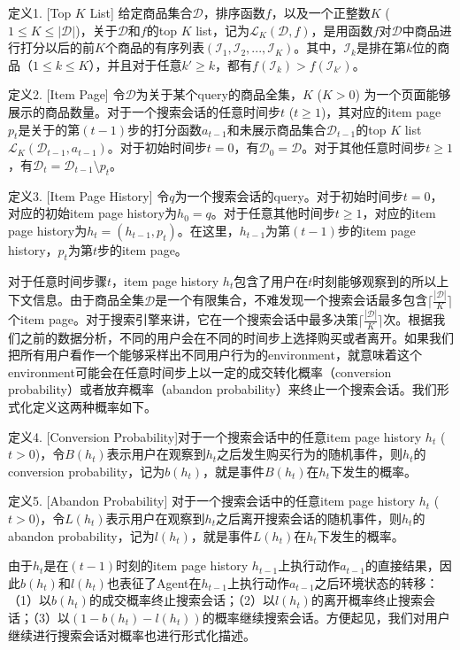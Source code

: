 定义1. [Top $K$ List]
给定商品集合$\mathcal{D}$，排序函数$f$，以及一个正整数$K$ ($1 \leq K \leq |\mathcal{D}|$)，关于$\mathcal{D}$和$f$的top $K$ list，记为$\mathcal{L}_K(\mathcal{D}, f)$，是用函数$f$对$\mathcal{D}$中商品进行打分以后的前$K$个商品的有序列表$(\mathcal{I}_1, \mathcal{I}_2, ..., \mathcal{I}_K)$。其中，$\mathcal{I}_k$是排在第$k$位的商品（$1 \leq k \leq K$），并且对于任意$k' \geq k$，都有$f(\mathcal{I}_k) > f(\mathcal{I}_{k'})$。

定义2. [Item Page]
令$\mathcal{D}$为关于某个query的商品全集，$K$ ($K > 0$) 为一个页面能够展示的商品数量。对于一个搜索会话的任意时间步$t$ ($t \geq 1$)，其对应的item page $p_{t}$是关于的第$(t-1)$步的打分函数$a_{t-1}$和未展示商品集合$\mathcal{D}_{t-1}$的top $K$ list $\mathcal{L}_K(\mathcal{D}_{t-1}, a_{t-1})$。对于初始时间步$t = 0$，有$\mathcal{D}_0 = \mathcal{D}$。对于其他任意时间步$t \geq 1$，有$\mathcal{D}_t = \mathcal{D}_{t-1} \setminus p_{t}$。

定义3. [Item Page History]
令$q$为一个搜索会话的query。对于初始时间步$t = 0$，对应的初始item page history为$h_0 = q$。对于任意其他时间步$t \geq 1$，对应的item page history为$h_t = (h_{t-1}, p_t)$。在这里，$h_{t-1}$为第$(t-1)$步的item page history，$p_t$为第$t$步的item page。

对于任意时间步骤$t$，item page history $h_t$包含了用户在$t$时刻能够观察到的所以上下文信息。由于商品全集$\mathcal{D}$是一个有限集合，不难发现一个搜索会话最多包含$\lceil \frac{|\mathcal{D}|}{K} \rceil$个item page。对于搜索引擎来讲，它在一个搜索会话中最多决策$\lceil \frac{|\mathcal{D}|}{K} \rceil$次。根据我们之前的数据分析，不同的用户会在不同的时间步上选择购买或者离开。如果我们把所有用户看作一个能够采样出不同用户行为的environment，就意味着这个environment可能会在任意时间步上以一定的成交转化概率（conversion probability）或者放弃概率（abandon probability）来终止一个搜索会话。我们形式化定义这两种概率如下。

定义4. [Conversion Probability]对于一个搜索会话中的任意item page history $h_t$ ($t > 0$)，令$B(h_t)$表示用户在观察到$h_t$之后发生购买行为的随机事件，则$h_t$的conversion probability，记为$b(h_t)$，就是事件$B(h_t)$在$h_t$下发生的概率。

定义5. [Abandon Probability]
对于一个搜索会话中的任意item page history $h_t$ ($t > 0$)，令$L(h_t)$表示用户在观察到$h_t$之后离开搜索会话的随机事件，则$h_t$的abandon probability，记为$l(h_t)$，就是事件$L(h_t)$在$h_t$下发生的概率。

由于$h_t$是在$(t-1)$时刻的item page history $h_{t-1}$上执行动作$a_{t-1}$的直接结果，因此$b(h_t)$和$l(h_t)$也表征了Agent在$h_{t-1}$上执行动作$a_{t-1}$之后环境状态的转移：（1）以$b(h_t)$的成交概率终止搜索会话；（2）以$l(h_t)$的离开概率终止搜索会话；（3）以$(1 - b(h_t) - l(h_t))$的概率继续搜索会话。方便起见，我们对用户继续进行搜索会话对概率也进行形式化描述。

